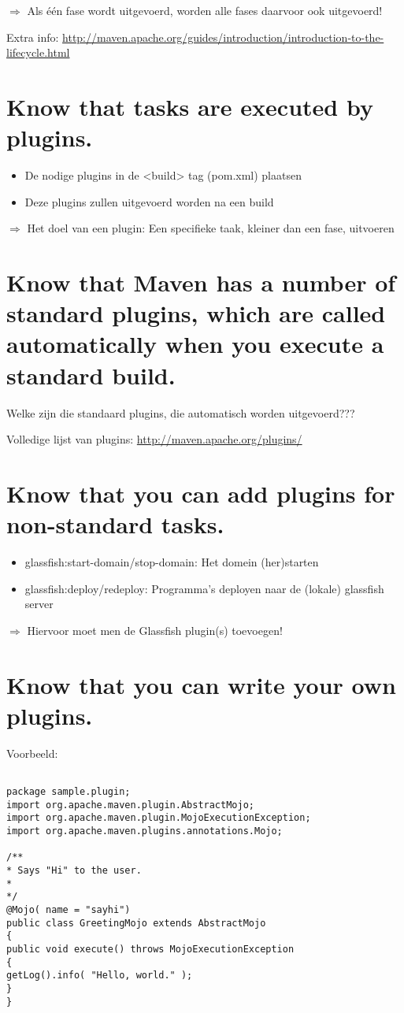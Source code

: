$\Rightarrow$ Als één fase wordt uitgevoerd, worden alle fases daarvoor ook uitgevoerd!

Extra info: \url{http://maven.apache.org/guides/introduction/introduction-to-the-lifecycle.html}

\section{Know that tasks are executed by plugins.}
\begin{itemize}
	\item De nodige plugins in de <build> tag (pom.xml) plaatsen
	\item Deze plugins zullen uitgevoerd worden na een build
\end{itemize}

$\Rightarrow$ Het doel van een plugin: Een specifieke taak, kleiner dan een fase, uitvoeren

\section{Know that Maven has a number of standard plugins, which are called automatically when you execute a standard build.}

Welke zijn die standaard plugins, die automatisch worden uitgevoerd???

Volledige lijst van plugins: \url{http://maven.apache.org/plugins/}

\section{Know that you can add plugins for non-standard tasks.}

\begin{itemize}
\item glassfish:start-domain/stop-domain: Het domein (her)starten
\item glassfish:deploy/redeploy: Programma’s deployen naar de (lokale) glassfish server
\end{itemize}

$\Rightarrow$ Hiervoor moet men de Glassfish plugin(s) toevoegen!

\section{Know that you can write your own plugins.}

Voorbeeld:

\begin{verbatim}

package sample.plugin;
import org.apache.maven.plugin.AbstractMojo;
import org.apache.maven.plugin.MojoExecutionException;
import org.apache.maven.plugins.annotations.Mojo;

/**
* Says "Hi" to the user.
*
*/
@Mojo( name = "sayhi")
public class GreetingMojo extends AbstractMojo
{
public void execute() throws MojoExecutionException
{
getLog().info( "Hello, world." );
}
}


\end{verbatim}







